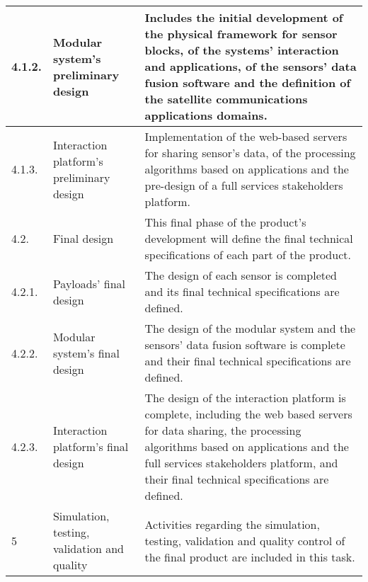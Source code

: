 \begin{longtable}[H]{p{1.5cm} >{\raggedright\arraybackslash}p{4cm} p{8cm}}
	\midrule
	
	4.1.2. & Modular system's preliminary design & Includes the initial development of the physical framework for sensor blocks, of the systems' interaction and applications, of the sensors' data fusion software and the definition of the satellite communications applications domains.\vspace{0.2cm} \\
	
	\midrule
	
	4.1.3. & Interaction platform's preliminary design & Implementation of the web-based servers for sharing sensor's data, of the processing algorithms based on applications and the pre-design of a full services stakeholders platform.\vspace{0.2cm} \\
	
	\midrule
	
	4.2. & Final design & This final phase of the product's development will define the final technical specifications of each part of the product.\vspace{0.2cm} \\
	
	\midrule
	
	4.2.1. & Payloads' final design & The design of each sensor is completed and its final technical specifications are defined.\vspace{0.2cm} \\
	
	\midrule
	
	4.2.2. & Modular system's final design & The design of the modular system and the sensors' data fusion software is complete and their final technical specifications are defined.\vspace{0.2cm} \\
	
	\midrule
	
	4.2.3. & Interaction platform's final design & The design of the interaction platform is complete, including the web based servers for data sharing, the processing algorithms based on applications and the full services stakeholders platform, and their final technical specifications are defined.\vspace{0.2cm} \\
	
	\midrule
	
	5 & Simulation, testing, validation and quality & Activities regarding the simulation, testing, validation and quality control of the final product are included in this task.\vspace{0.2cm} \\
	

\end{longtable}
